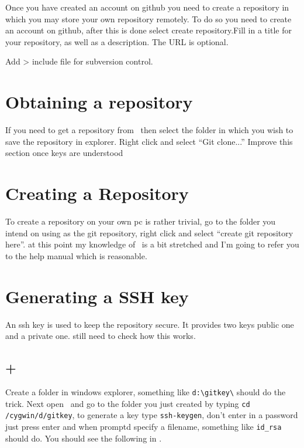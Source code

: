 Once you have created an account on github you need to create a repository in which you may store your own repository remotely. To do so you need to create an account on github, after this is done select create repository.Fill in a title for your repository, as well as a description. The URL is optional.

Add > include file for subversion control.

\section{Obtaining a repository}

If you need to get a repository from \gh\ then select the folder in which you wish to save the repository in explorer. Right click and select ``Git clone...'' %
\ed Improve this section once keys are understood \ed
 
\section{Creating a Repository}

To create a repository on your own pc is rather trivial, go to the folder you intend on using as the git repository, right click and select ``create git repository here''. \ed at this point my knowledge of \git\ is a bit stretched and I'm going to refer you to the help manual which is reasonable. \ed

\section{Generating a SSH key}

An ssh key is used to keep the repository secure. It provides two keys  public one and a private one. \ed still need to check how this works.

\subsection{\git + \cyg}

Create a folder in windows explorer, something like \verb|d:\gitkey\| should do the trick. Next open \cyg\ and go to the folder you just created by typing \verb|cd /cygwin/d/gitkey|, to generate a key type \verb|ssh-keygen|, don't enter in a password just press enter and when promptd specify a filename, something like \verb|id_rsa| should do. You should see the following in \cyg. 

